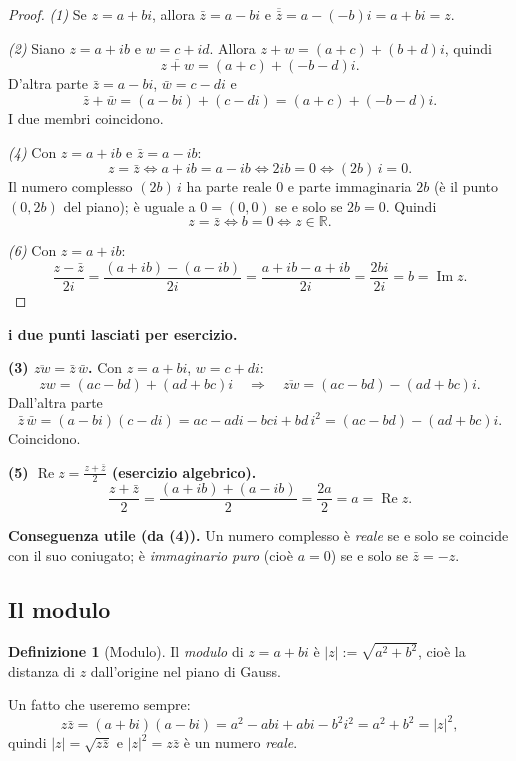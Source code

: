 \documentclass[11pt,a4paper]{article}
\newcommand{\RR}{\mathbb{R}}
\renewcommand{\Re}{\operatorname{Re}}
\renewcommand{\Im}{\operatorname{Im}}
\theoremstyle{plain}
\theoremstyle{definition}
\newtheorem{defn}[prop]{Definizione}
\theoremstyle{remark}
\begin{document}
\begin{proof}
\emph{(1)} Se $z=a+bi$, allora $\bar z=a-bi$ e $\overline{\bar z}=a-(-b)i=a+bi=z$.

\emph{(2)} Siano $z=a+ib$ e $w=c+id$. Allora $z+w=(a+c)+(b+d)i$, quindi
\[
  \overline{z+w}=(a+c)+(-b-d)i .
\]
D'altra parte $\bar z=a-bi$, $\bar w=c-di$ e
\[
  \bar z+\bar w=(a-bi)+(c-di)=(a+c)+(-b-d)i .
\]
I due membri coincidono.

\emph{(4)} Con $z=a+ib$ e $\bar z=a-ib$:
\[
  z=\bar z \iff a+ib=a-ib \iff 2ib=0 \iff (2b)\,i=0 .
\]
Il numero complesso $(2b)\,i$ ha parte reale $0$ e parte immaginaria $2b$ (è il punto $(0,2b)$ del piano);
è uguale a $0=(0,0)$ se e solo se $2b=0$. Quindi
\[
  z=\bar z\iff b=0\iff z\in\RR .
\]

\emph{(6)} Con $z=a+ib$:
\[
  \frac{z-\bar z}{2i}=\frac{(a+ib)-(a-ib)}{2i}=\frac{a+ib-a+ib}{2i}=\frac{2bi}{2i}=b=\Im z .
\]
\end{proof}

\par\medskip
\noindent\textbf{i due punti lasciati per esercizio.}\par

\textbf{(3) $\overline{zw}=\bar z\,\bar w$.}
Con $z=a+bi$, $w=c+di$:
\[
  zw=(ac-bd)+(ad+bc)i\quad\Longrightarrow\quad \overline{zw}=(ac-bd)-(ad+bc)i .
\]
Dall'altra parte
\[
  \bar z\,\bar w=(a-bi)(c-di)=ac-adi-bci+bd\,i^2=(ac-bd)-(ad+bc)i .
\]
Coincidono.

\medskip
\textbf{(5) $\Re z=\frac{z+\bar z}{2}$ (esercizio algebrico).}
\[
  \frac{z+\bar z}{2}=\frac{(a+ib)+(a-ib)}{2}=\frac{2a}{2}=a=\Re z .
\]

\medskip
\textbf{Conseguenza utile (da (4)).} Un numero complesso è \emph{reale} se e solo se coincide con il suo coniugato;
è \emph{immaginario puro} (cioè $a=0$) se e solo se $\bar z=-z$.
\par\medskip

\subsection{Il modulo}

\begin{defn}[Modulo]
Il \emph{modulo} di $z=a+bi$ è $|z|:=\sqrt{a^2+b^2}$, cioè la distanza di $z$ dall'origine nel piano di Gauss.
\end{defn}

Un fatto che useremo sempre:
\begin{equation}\label{eq:zzbar}
  z\bar z=(a+bi)(a-bi)=a^2-abi+abi-b^2i^2=a^2+b^2=|z|^2,
\end{equation}
quindi $|z|=\sqrt{z\bar z}$ e $|z|^2=z\bar z$ è un numero \emph{reale}.
\end{document}
